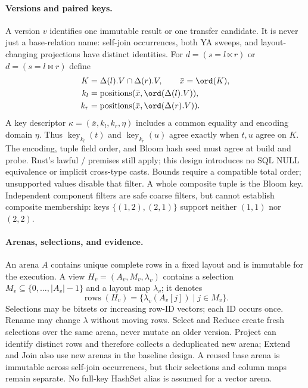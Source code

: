 \paragraph{Versions and paired keys.}
A version $v$ identifies one immutable result or one transfer candidate.
It is never just a base-relation name: self-join occurrences, both YA sweeps,
and layout-changing projections have distinct identities.
For $d=(s=l\ltimes r)$ or $d=(s=l\bowtie r)$ define
\[
 \begin{aligned}
 K&=\Delta(l).V\cap\Delta(r).V,\qquad \bar x=\ord(K),\\
 k_l&=\operatorname{positions}(\bar x,\ord(\Delta(l).V)),\\
 k_r&=\operatorname{positions}(\bar x,\ord(\Delta(r).V)).
 \end{aligned}
\]
A key descriptor $\kappa=(\bar x,k_l,k_r,\eta)$ includes a common equality
and encoding domain $\eta$. Thus $\operatorname{key}_{k_l}(t)$ and
$\operatorname{key}_{k_r}(u)$ agree exactly when $t,u$ agree on $K$.
The encoding, tuple field order, and Bloom hash seed must agree at build and
probe. Rust's lawful / premises still apply; this design
introduces no SQL NULL equivalence or implicit cross-type casts. Bounds
require a compatible total order; unsupported values disable that filter.
A whole composite tuple is the Bloom key. Independent component filters are
safe coarse filters, but cannot establish composite membership: keys
$\{(1,2),(2,1)\}$ support neither $(1,1)$ nor $(2,2)$.

\paragraph{Arenas, selections, and evidence.}
An arena $A$ contains unique complete rows in a fixed layout and is immutable
for the execution. A view $H_v=(A_v,M_v,\lambda_v)$ contains a selection
$M_v\subseteq\{0,\ldots,|A_v|-1\}$ and a layout map $\lambda_v$; it denotes
\[
 \operatorname{rows}(H_v)=
 \{\lambda_v(A_v[j])\mid j\in M_v\}.
\]
Selections may be bitsets or increasing row-ID vectors; each ID occurs once.
Rename may change $\lambda$ without moving rows. Select and Reduce create
fresh selections over the same arena, never mutate an older version.
Project can identify distinct rows and therefore collects a deduplicated
new arena; Extend and Join also use new arenas in the baseline design.
A reused base arena is immutable across self-join occurrences, but their
selections and column maps remain separate. No full-key HashSet alias is
assumed for a vector arena.

